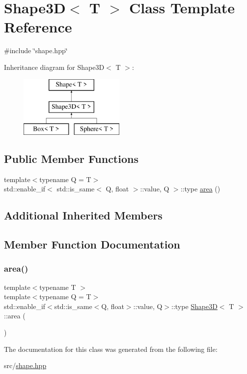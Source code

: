 \hypertarget{classShape3D}{}\section{Shape3D$<$ T $>$ Class Template Reference}
\label{classShape3D}


{\ttfamily \#include \char`\"{}shape.\+hpp\char`\"{}}

Inheritance diagram for Shape3D$<$ T $>$\+:\begin{figure}[H]
\begin{center}
\leavevmode
\includegraphics[height=3.000000cm]{classShape3D}
\end{center}
\end{figure}
\subsection*{Public Member Functions}
\begin{DoxyCompactItemize}
\item 
{\footnotesize template$<$typename Q  = T$>$ }\\std\+::enable\+\_\+if$<$ std\+::is\+\_\+same$<$ Q, float $>$\+::value, Q $>$\+::type \mbox{\hyperlink{classShape3D_a2e50becd374a83f43617328dbcc2de3b}{area}} ()
\end{DoxyCompactItemize}
\subsection*{Additional Inherited Members}


\subsection{Member Function Documentation}
\mbox{\label{classShape3D_a2e50becd374a83f43617328dbcc2de3b}} 
\subsubsection{\texorpdfstring{area()}{area()}}
{\footnotesize\ttfamily template$<$typename T $>$ \\
template$<$typename Q  = T$>$ \\
std\+::enable\+\_\+if$<$std\+::is\+\_\+same$<$Q, float$>$\+::value, Q$>$\+::type \mbox{\hyperlink{classShape3D}{Shape3D}}$<$ T $>$\+::area (\begin{DoxyParamCaption}{ }\end{DoxyParamCaption})\hspace{0.3cm}{\ttfamily [inline]}}



The documentation for this class was generated from the following file\+:\begin{DoxyCompactItemize}
\item 
src/\mbox{\hyperlink{shape_8hpp}{shape.\+hpp}}\end{DoxyCompactItemize}
